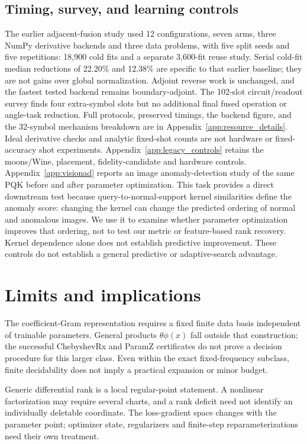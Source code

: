 \documentclass[a4paper,twocolumn,11pt,unpublished]{quantumarticle}
\begin{document}
\subsection{Timing, survey, and learning controls}
The earlier adjacent-fusion study used 12 configurations, seven arms,
three NumPy derivative backends and three data problems, with five split
seeds and five repetitions: 18,900 cold fits and a separate 3,600-fit
reuse study. Serial cold-fit median reductions of 22.20\% and 12.38\%
are specific to that earlier baseline; they are not gains over global
normalization. Adjoint reverse work is unchanged, and the fastest
tested backend remains boundary-adjoint. The 102-slot circuit/readout
survey finds four extra-symbol slots but no additional final fused
operation or angle-task reduction. Full protocols, preserved timings,
the backend figure, and the 32-symbol mechanism breakdown are in
Appendix~\ref{app:resource_details}. Ideal derivative checks and analytic
fixed-shot counts are not hardware or fixed-accuracy shot experiments.
Appendix~\ref{app:legacy_controls} retains the moons/Wine, placement,
fidelity-candidate and hardware controls. Appendix~\ref{app:visionad}
reports an image anomaly-detection study of the same PQK before and
after parameter optimization. This task provides a direct downstream
test because query-to-normal-support kernel similarities define the
anomaly score: changing the kernel can change the predicted ordering
of normal and anomalous images. We use it to examine whether parameter
optimization improves that ordering, not to test our metric or
feature-based rank recovery. Kernel dependence alone does not
establish predictive improvement.
These controls do not establish a general predictive or adaptive-search
advantage.

\section{Limits and implications}
The coefficient-Gram representation requires a fixed finite data basis
independent of trainable parameters. General products $\theta\phi(x)$
fall outside that construction; the successful ChebyshevRx and ParamZ
certificates do not prove a decision procedure for this larger class.
Even within the exact fixed-frequency subclass, finite decidability
does not imply a practical expansion or minor budget.

Generic differential rank is a local regular-point statement. A
nonlinear factorization may require several charts, and a rank deficit
need not identify an individually deletable coordinate. The loss-gradient
space changes with the parameter point; optimizer state, regularizers
and finite-step reparameterizations need their own treatment.
\end{document}
